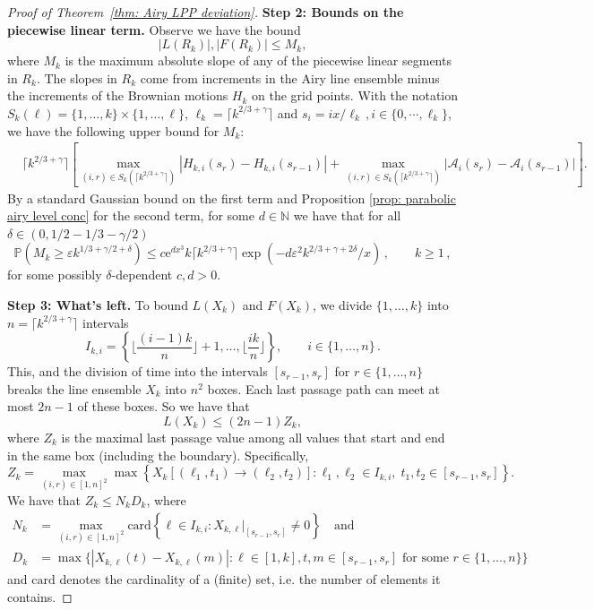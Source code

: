 \documentclass[11pt, reqno]{amsart}
\numberwithin{equation}{section}
\newcommand{\N}{\ensuremath{\mathbb{N}}}
\newcommand{\PP}{\ensuremath{\mathbb{P}}}
\newcommand{\ceil}[1]{\lceil #1 \rceil}
\begin{document}
\begin{proof}[Proof of Theorem~\ref{thm: Airy LPP deviation}]
\noindent \textbf{Step 2: Bounds on the piecewise linear term.}  Observe we have the bound
$$
|L(R_k)|, |F(R_k)| \le M_k,
$$
where $M_k$ is the maximum absolute slope of any of the piecewise linear segments in $R_k$. The slopes in $R_k$ come from increments in the Airy line ensemble minus the increments of the Brownian motions $H_k$ on the grid points. With the notation $S_k(\ell) = \{1, \dots, k\} \times \{1, \dots, \ell\}$, $\ell_k = \lceil k^{2/3+\gamma}\rceil$ and $s_i = ix/\ell_k\,, i\in \{0,\cdots, \ell_k\}$, we have the following upper bound for $M_k$:
\begin{align*}
&\ceil{k^{2/3 + \gamma}}\left[\max_{(i, r) \in S_k(\ceil{k^{2/3 + \gamma}})} |H_{k, i}(s_{r}) - H_{k, i}(s_{r-1})|+ \max_{(i, r) \in S_k(\ceil{k^{2/3 + \gamma}})} |\mathcal{A}_i(s_{r}) - \mathcal{A}_i(s_{r-1})|\right].
\end{align*}
By a standard Gaussian bound on the first term and Proposition \ref{prop: parabolic airy level conc} for the second term, for some $d \in \N$ we have that for all $\delta \in (0, 1/2-1/3-\gamma/2)$
\begin{equation}
\label{eq: Mk}
\PP \left(M_k \ge \varepsilon k^{1/3 + \gamma/2 + \delta} \right) \le c \mathrm{e}^{dx^3}k\lceil k^{2/3+\gamma}\rceil\exp \left(-d \varepsilon^2 k^{2/3+\gamma + 2\delta}/x\right)\,, \qquad k\ge 1\,,
\end{equation}
for some possibly $\delta$-dependent $c, d>0$.
\medskip

\noindent \textbf{Step 3: What's left.}
To bound $L(X_k)$ and $F(X_k)$, we divide $\{1,\dots,k\}$ into $n= \ceil{k^{2/3+\gamma}}$ intervals
$$
I_{k, i} = \left\{ \bigg\lfloor\frac{(i-1)k}n\bigg\rfloor + 1, \dots, \bigg\lfloor\frac{ik}n\bigg\rfloor\right\}, \qquad i \in \{1, \dots, n\}\,.
$$
This, and the division of time into the intervals $[s_{r-1}, s_r]$ for $r \in \{1, \dots, n\}$ breaks the line ensemble $X_k$ into $n^2$ boxes. Each last passage path can meet at most $2n-1$ of these boxes. So we have that
\begin{equation}
\label{eq: Xk}
L(X_k) \le (2n-1)Z_k,
\end{equation}
where $Z_k$ is the maximal last passage value among all values that start and end in the same box (including the boundary). Specifically,
$$
Z_k = \max_{(i, r) \in [1, n]^2} \max \left\{ X_k[(\ell_1, t_1) \rightarrow (\ell_2, t_2)] : \ell_1, \ell_2 \in I_{k, i}, \; t_1, t_2 \in [s_{r-1}, s_r]\right\}.
$$
We have that $Z_k \le N_kD_k$, where
\begin{align*}
N_k &= \max_{(i, r) \in [1, n]^2} \mathrm{card}{\left\{ \ell \in I_{k, i} : X_{k,\ell}|_{[s_{r-1}, s_{r}]} \ne 0\right\}} \quad \mathrm{and} \\
 D_k &= \max \bigg\{ |X_{k, \ell}(t) - X_{k, \ell}(m)| : \ell \in [1, k], t, m \in [s_{r-1}, s_r] \text{ for some } r \in \{1, \dots, n\} \bigg\}
\end{align*}
and $\mathrm{card}$ denotes the cardinality of a (finite) set, i.e. the number of elements it contains.


\end{proof}
\end{document}
